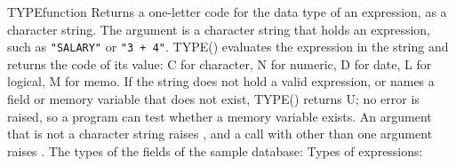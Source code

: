 \begin{XbaseEntry}{TYPE}{function}
Returns a one-letter code for the data type of an expression, as a character string.
\Syntax
{}
\Usage
The argument is a character string that holds an expression, such as \texttt{"SALARY"} or \texttt{"3 + 4"}.  TYPE() evaluates the expression in the string and returns the code of its value: C for character, N for numeric, D for date, L for logical, M for memo.  If the string does not hold a valid expression, or names a field or memory variable that does not exist, TYPE() returns U; no error is raised, so a program can test whether a memory variable exists.  An argument that is not a character string raises , and a call with other than one argument raises .
\Examples
The types of the fields of the sample database:
Types of expressions:
\end{XbaseEntry}

